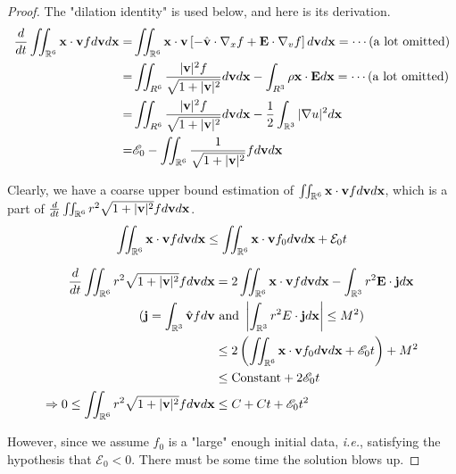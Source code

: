 \begin{proof}
    The "dilation identity" is used below, and here is its derivation.
    \begin{equation}
        \begin{aligned}
        \frac{d}{d t} \iint_{\mathbb{R}^{6}} \mathbf{x} \cdot \mathbf{v} f d \mathbf{v} d \mathbf{x}=& \iint_{{\mathbb{R}}^{6}} \mathbf{x} \cdot \mathbf{v}\left[-\hat{\mathbf{v}} \cdot \nabla_{x} f+\mathbf{E} \cdot \nabla_{v} f\right] d \mathbf{v} d \mathbf{x} = \cdots \text{(a lot omitted)}\\
        =& \iint_{R^{6}} \frac{|\mathbf{v}|^{2} f}{\sqrt{1+|\mathbf{v}|^{2}}} d \mathbf{v} d \mathbf{x}-\int_{R^{3}} \rho \mathbf{x} \cdot \mathbf{E} d \mathbf{x} = \cdots \text{(a lot omitted)}\\
        =& \iint_{R^{6}} \frac{|\mathbf{v}|^{2} f}{\sqrt{1+|\mathbf{v}|^{2}}} d \mathbf{v} d \mathbf{x} - \frac{1}{2} \int_{{\mathbb{R}}^{3}}|\nabla u|^{2} d \mathbf{x}\\
        =& \mathscr{E}_{0}-\iint_{{\mathbb{R}}^{6}} \frac{1}{\sqrt{1+|\mathbf{v}|^{2}}} f d \mathbf{v} d \mathbf{x}
        \end{aligned}
        \end{equation}
    
    Clearly, we have a coarse upper bound estimation of $\iint_{\mathbb{R}^{6}} \mathbf{x} \cdot \mathbf{v} f d \mathbf{v} d \mathbf{x}$, which is a part of $\frac{d}{d t} \iint_{\mathbb{R}^{6}} r^{2} \sqrt{1+|\mathbf{v}|^{2}} f d \mathbf{v} d \mathbf{x} $.
    $$\iint_{\mathbb{R}^{6}} \mathbf{x} \cdot \mathbf{v} f d \mathbf{v} d \mathbf{x}\leq \iint_{\mathbb{R}^{6}} \mathbf{x} \cdot \mathbf{v} f_0 d \mathbf{v} d \mathbf{x}+\mathcal{E}_0 t$$

    \begin{equation}
        \begin{aligned}
        \frac{d}{d t} \iint_{\mathbb{R}^{6}} r^{2} \sqrt{1+|\mathbf{v}|^{2}} f d \mathbf{v} d \mathbf{x} &=2 \iint_{{\mathbb{R}}^{6}} \mathbf{x} \cdot \mathbf{v} f d \mathbf{v} d \mathbf{x}-\int_{{\mathbb{R}}^{3}} r^{2} \mathbf{E} \cdot \mathbf{j} d \mathbf{x}\\
        ( \mathbf{j}=\int_{\mathbb{R}^{3}} \hat{\mathbf{v}} f d \mathbf{v}& \text{ and } \left|\int_{\mathbb{R}^{3}} r^{2} E \cdot \mathbf{j} d \mathbf{x}\right|   \leq M^{2})\\
        &\leq 2\left(\iint_{\mathbb{R}^{6}} \mathbf{x} \cdot \mathbf{v} f_0 d \mathbf{v} d \mathbf{x}+\mathscr{E}_{0} t\right)+M^{2}\\        
        &\leq \text{Constant} + 2\mathscr{E}_{0} t\\
        \Rightarrow 0\leq \iint_{\mathbb{R}^{6}} r^{2} \sqrt{1+|\mathbf{v}|^{2}} f d \mathbf{v} d \mathbf{x} &\leq C + Ct + \mathscr{E}_{0} t^2\\
    \end{aligned}
    \end{equation}

    However, since we assume $f_0$ is a "large" enough initial data, \textit{i.e.}, satisfying the hypothesis that $\mathscr{E}_0<0$. There must be some time the solution blows up.
\end{proof}


